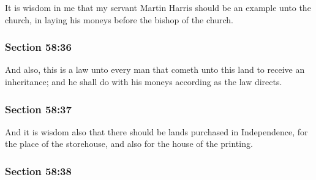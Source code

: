 		It is wisdom in me that my servant Martin Harris should be an example unto the church, in laying his moneys before the bishop of the church.


	\subsubsection{Section 58:36} %
		\label{DC58-36}

		And also, this is a law unto every man that cometh unto this land to receive an inheritance; and he shall do with his moneys according as the law directs.


	\subsubsection{Section 58:37} %
		\label{DC58-37}

		And it is wisdom also that there should be lands purchased in Independence, for the place of the storehouse, and also for the house of the printing.


	\subsubsection{Section 58:38} %
		\label{DC58-38}

